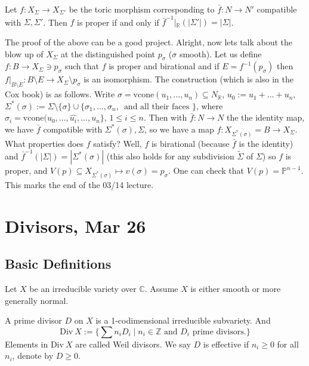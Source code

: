 \documentclass[a4paper,12pt]{amsart}
\newcommand{\ZZ}{\mathbb{Z}}
\newcommand{\CC}{\mathbb{C}}
\newcommand{\R}{\ensuremath{\mathbb{R}}}
\begin{document}
\begin{Theorem}
    Let $f: X_\Sigma \to X_{\Sigma'}$ be the toric morphism corresponding to $\bar{f} : N \to N'$ compatible with $\Sigma, \Sigma'$. Then $f$ is proper if and only if $\bar{f}^{-1}|_{\R} (|\Sigma'|) = |\Sigma|$.
\end{Theorem}
\noindent The proof of the above can be a good project. Alright, now lets talk about the blow up of $X_\Sigma$ at the distinguished point $p_\sigma$ ($\sigma$ smooth). Let us define $f: B \to X_{\Sigma} \ni p_{\sigma}$ such that $f$ is proper and birational and if $E = f^{-1}(p_\sigma)$ then $f|_{B \setminus E} : B \setminus E \to X_{\Sigma} \setminus p_\sigma$ is an isomorphism. The construction (which is also in the Cox book) is as follows. Write $\sigma = \text{vcone}(u_1,...,u_n) \subseteq N_\R$, $u_0 := u_1 + ... + u_n$, $\Sigma^* (\sigma) := \Sigma \setminus \{\sigma\} \cup \{\sigma_1,...,\sigma_n, \, \text{ and all their faces } \}$, where $\sigma_i = \text{vcone} (u_0, ..., \hat{u_i}, ..., u_n \}$, $1 \leq i \leq n$. Then with $\bar{f}: N \to N$ the the identity map, we have $\bar{f}$ compatible with $\Sigma^*(\sigma), \Sigma$, so we have a map $f: X_{\Sigma^*(\sigma)} = B \to X_{\Sigma}$. What properties does $f$ satisfy? Well, $f$ is birational (because $\bar{f}$ is the identity) and $\bar{f}^{-1}(|\Sigma|) = |\Sigma^*(\sigma)|$ (this also holds for any subdivision $\widetilde{\Sigma}$ of $\Sigma$) so $f$ is proper, and $V(p) \subseteq X_{\Sigma^*(\sigma)} \mapsto v(\sigma) = p_\sigma$. One can check that $V(p) = \mathbb{P}^{n-1}$. This marks the end of the 03/14 lecture.
\newpage
\section{Divisors, Mar 26}

\subsection{Basic Definitions}

Let $X$ be an irreducible variety over $\CC$. Assume $X$ is either smooth or more generally normal.

\begin{definition}
	A prime divisor $D$ on $X$ is a 1-codimensional irreducible subvariety. And
	\begin{displaymath}
	\mathrm{Div}~X:=\{\sum n_iD_i\mid n_i\in\ZZ\text{ and }D_i\text{ prime divisors.}\}
	\end{displaymath}
	Elements in $\mathrm{Div}~X$ are called Weil divisors. We say $D$ is effective if $n_i\geq0$ for all $n_i$, denote by $D\geq0$.
\end{definition}
\end{document}
